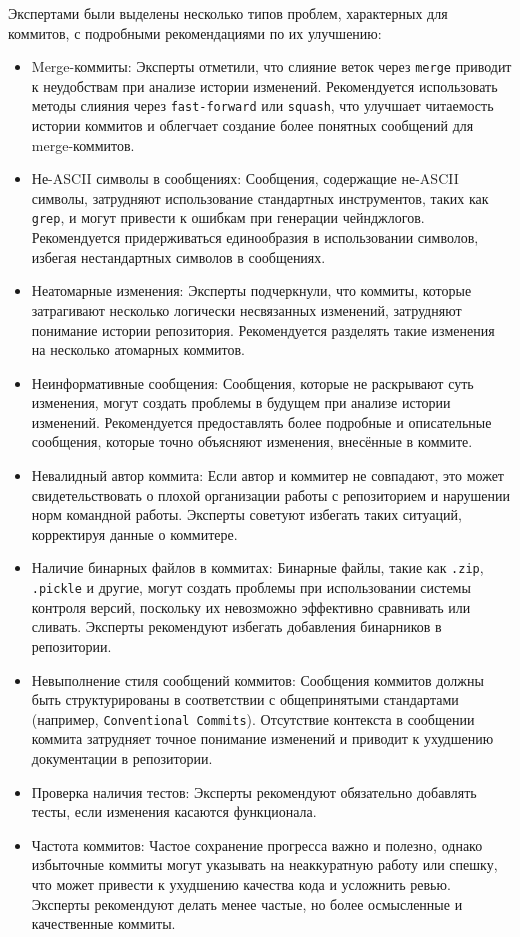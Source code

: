 \begin{itemize}
Экспертами были выделены несколько типов проблем, характерных для коммитов, с подробными рекомендациями по их улучшению:

\begin{itemize}
	\item Merge-коммиты: Эксперты отметили, что слияние веток через \texttt{merge} приводит к неудобствам при анализе истории изменений. Рекомендуется использовать методы слияния через \texttt{fast-forward} или \texttt{squash}, что улучшает читаемость истории коммитов и облегчает создание более понятных сообщений для merge-коммитов.
	\item Не-ASCII символы в сообщениях: Сообщения, содержащие не-ASCII символы, затрудняют использование стандартных инструментов, таких как \texttt{grep}, и могут привести к ошибкам при генерации чейнджлогов. Рекомендуется придерживаться единообразия в использовании символов, избегая нестандартных символов в сообщениях.
	\item Неатомарные изменения: Эксперты подчеркнули, что коммиты, которые затрагивают несколько логически несвязанных изменений, затрудняют понимание истории репозитория. Рекомендуется разделять такие изменения на несколько атомарных коммитов.
	\item Неинформативные сообщения: Сообщения, которые не раскрывают суть изменения, могут создать проблемы в будущем при анализе истории изменений. Рекомендуется предоставлять более подробные и описательные сообщения, которые точно объясняют изменения, внесённые в коммите.
	\item Невалидный автор коммита: Если автор и коммитер не совпадают, это может свидетельствовать о плохой организации работы с репозиторием и нарушении норм командной работы. Эксперты советуют избегать таких ситуаций, корректируя данные о коммитере.
	\item Наличие бинарных файлов в коммитах: Бинарные файлы, такие как \texttt{.zip}, \texttt{.pickle} и другие, могут создать проблемы при использовании системы контроля версий, поскольку их невозможно эффективно сравнивать или сливать. Эксперты рекомендуют избегать добавления бинарников в репозитории.
	\item Невыполнение стиля сообщений коммитов: Сообщения коммитов должны быть структурированы в соответствии с общепринятыми стандартами (например, \texttt{Conventional Commits}). Отсутствие контекста в сообщении коммита затрудняет точное понимание изменений и приводит к ухудшению документации в репозитории.
	\item Проверка наличия тестов: Эксперты рекомендуют обязательно добавлять тесты, если изменения касаются функционала.
	\item Частота коммитов: Частое сохранение прогресса важно и полезно, однако избыточные коммиты могут указывать на неаккуратную работу или спешку, что может привести к ухудшению качества кода и усложнить ревью. Эксперты рекомендуют делать менее частые, но более осмысленные и качественные коммиты.
\end{itemize}


\end{itemize}
